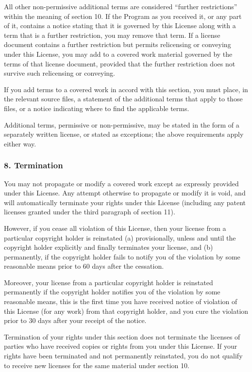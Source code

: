 \documentclass[a4paper, 11pt, twoside]{article}
\begin{document}
All other non-permissive additional terms are considered “further restrictions” within the meaning of section 10. If the Program as you received it, or any part of it, contains a notice stating that it is governed by this License along with a term that is a further restriction, you may remove that term. If a license document contains a further restriction but permits relicensing or conveying under this License, you may add to a covered work material governed by the terms of that license document, provided that the further restriction does not survive such relicensing or conveying.

If you add terms to a covered work in accord with this section, you must place, in the relevant source files, a statement of the additional terms that apply to those files, or a notice indicating where to find the applicable terms.

Additional terms, permissive or non-permissive, may be stated in the form of a separately written license, or stated as exceptions; the above requirements apply either way.

\subsubsection{8. Termination}

You may not propagate or modify a covered work except as expressly provided under this License. Any attempt otherwise to propagate or modify it is void, and will automatically terminate your rights under this License (including any patent licenses granted under the third paragraph of section 11).

However, if you cease all violation of this License, then your license from a particular copyright holder is reinstated (a) provisionally, unless and until the copyright holder explicitly and finally terminates your license, and (b) permanently, if the copyright holder fails to notify you of the violation by some reasonable means prior to 60 days after the cessation.

Moreover, your license from a particular copyright holder is reinstated permanently if the copyright holder notifies you of the violation by some reasonable means, this is the first time you have received notice of violation of this License (for any work) from that copyright holder, and you cure the violation prior to 30 days after your receipt of the notice.

Termination of your rights under this section does not terminate the licenses of parties who have received copies or rights from you under this License. If your rights have been terminated and not permanently reinstated, you do not qualify to receive new licenses for the same material under section 10.
\end{document}
